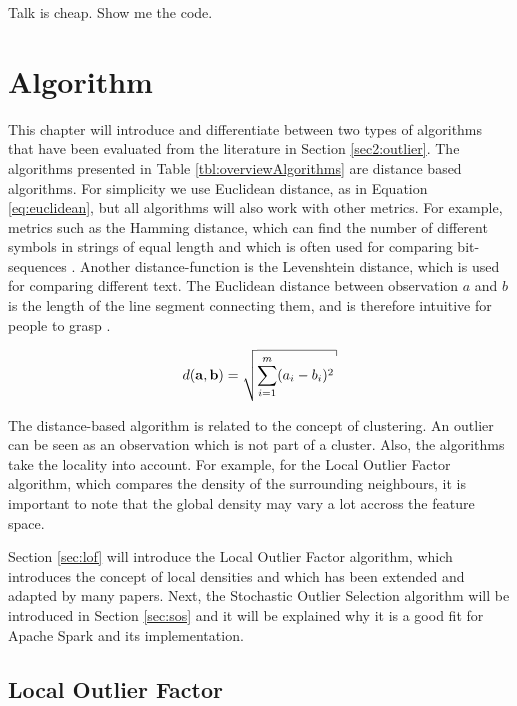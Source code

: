 \begin{savequote}[75mm] 
Talk is cheap. Show me the code.  
\end{savequote}

\chapter{Algorithm \label{chap4:algorithm}}

This chapter will introduce and differentiate between two types of algorithms that have been evaluated from the literature in Section \ref{sec2:outlier}. The algorithms presented in Table \ref{tbl:overviewAlgorithms} are distance based algorithms. For simplicity we use Euclidean distance, as in Equation \ref{eq:euclidean}, but all algorithms will also work with other metrics. For example, metrics such as the Hamming distance, which can find the number of different symbols in strings of equal length and which is often used for comparing bit-sequences \cite{citeulike:1667687}. Another distance-function is the Levenshtein distance, which is used for comparing different text. The Euclidean distance between observation $a$ and $b$ is the length of the line segment connecting them, and is therefore intuitive for people to grasp \cite{Deza2009EncyclopediaofDistances}.

\begin{equation}
d({\bf a},{\bf b}) = \sqrt{\sum^{m}_{i=1} (a_{i} - b_{i})^2} \label{eq:euclidean}
\end{equation}

The distance-based algorithm is related to the concept of clustering. An outlier can be seen as an observation which is not part of a cluster. Also, the algorithms take the locality into account. For example, for the Local Outlier Factor algorithm, which compares the density of the surrounding neighbours, it is important to note that the global density may vary a lot accross the feature space.

Section \ref{sec:lof} will introduce the Local Outlier Factor algorithm, which introduces the concept of local densities and which has been extended and adapted by many papers. Next, the Stochastic Outlier Selection algorithm will be introduced in Section \ref{sec:sos} and it will be explained why it is a good fit for Apache Spark and its implementation.

\section{Local Outlier Factor \label{sec:lof}}

